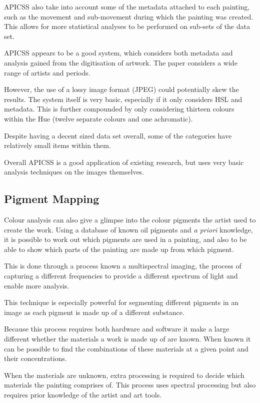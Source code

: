 \documentclass[conference]{IEEEtran}
\begin{document}
\gls{APICSS} also take into account some of the metadata attached to each
painting, such as the movement and sub-movement during which the painting was
created. This allows for more statistical analyses to be performed on sub-sets
of the data set.

\gls{APICSS} appears to be a good system, which considers both metadata and
analysis gained from the digitisation of artwork. The paper considers a wide
range of artists and periods.

However, the use of a lossy image format (JPEG) could potentially skew the
results. The system itself is very basic, especially if it only considers
\gls{HSL} and metadata. This is further compounded by only considering thirteen
colours within the Hue (twelve separate colours and one achromatic).

Despite having a decent sized data set overall, some of the categories have
relatively small items within them.

Overall \gls{APICSS} is a good application of existing research, but uses very
basic analysis techniques on the images themselves.


\subsection{Pigment Mapping}
Colour analysis can also give a glimpse into the colour pigments the artist
used to create the work. Using a database of known oil pigments and
\textit{a priori} knowledge, it is possible to work out which pigments are used
in a painting, and also to be able to show which parts of the painting are made
up from which pigment\cite{zhao2008investigation}.

This is done through a process known a multispectral imaging, the process of
capturing a different frequencies to provide a different spectrum of light and
enable more analysis.

This technique is especially powerful for segmenting different pigments in an
image as each pigment is made up of a different substance.

Because this process requires both hardware and software it make a large
different whether the materials a work is made up of are known. When known it
can be possible to find the combinations of these materials at a given point
and their concentrations.

When the materials are unknown, extra processing is required to decide which
materials the painting comprises of. This process uses spectral processing but
also requires prior knowledge of the artist and art tools.
\end{document}

